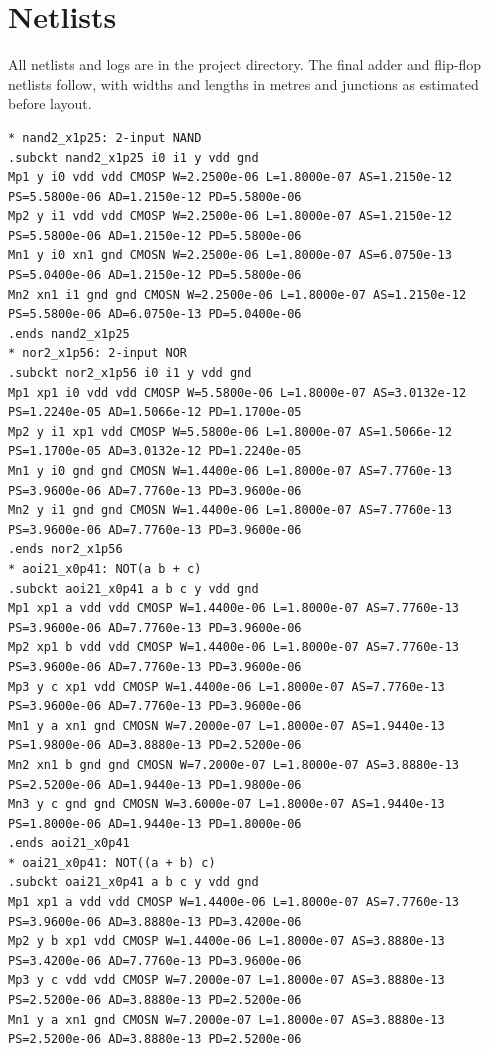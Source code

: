\documentclass[10pt,a4paper]{article}
\begin{document}
\section{Netlists}
All netlists and logs are in the project directory. The final adder and flip-flop netlists follow, with widths and lengths in metres and junctions as estimated before layout.

{\tiny
\begin{verbatim}
* nand2_x1p25: 2-input NAND
.subckt nand2_x1p25 i0 i1 y vdd gnd
Mp1 y i0 vdd vdd CMOSP W=2.2500e-06 L=1.8000e-07 AS=1.2150e-12 PS=5.5800e-06 AD=1.2150e-12 PD=5.5800e-06
Mp2 y i1 vdd vdd CMOSP W=2.2500e-06 L=1.8000e-07 AS=1.2150e-12 PS=5.5800e-06 AD=1.2150e-12 PD=5.5800e-06
Mn1 y i0 xn1 gnd CMOSN W=2.2500e-06 L=1.8000e-07 AS=6.0750e-13 PS=5.0400e-06 AD=1.2150e-12 PD=5.5800e-06
Mn2 xn1 i1 gnd gnd CMOSN W=2.2500e-06 L=1.8000e-07 AS=1.2150e-12 PS=5.5800e-06 AD=6.0750e-13 PD=5.0400e-06
.ends nand2_x1p25
* nor2_x1p56: 2-input NOR
.subckt nor2_x1p56 i0 i1 y vdd gnd
Mp1 xp1 i0 vdd vdd CMOSP W=5.5800e-06 L=1.8000e-07 AS=3.0132e-12 PS=1.2240e-05 AD=1.5066e-12 PD=1.1700e-05
Mp2 y i1 xp1 vdd CMOSP W=5.5800e-06 L=1.8000e-07 AS=1.5066e-12 PS=1.1700e-05 AD=3.0132e-12 PD=1.2240e-05
Mn1 y i0 gnd gnd CMOSN W=1.4400e-06 L=1.8000e-07 AS=7.7760e-13 PS=3.9600e-06 AD=7.7760e-13 PD=3.9600e-06
Mn2 y i1 gnd gnd CMOSN W=1.4400e-06 L=1.8000e-07 AS=7.7760e-13 PS=3.9600e-06 AD=7.7760e-13 PD=3.9600e-06
.ends nor2_x1p56
* aoi21_x0p41: NOT(a b + c)
.subckt aoi21_x0p41 a b c y vdd gnd
Mp1 xp1 a vdd vdd CMOSP W=1.4400e-06 L=1.8000e-07 AS=7.7760e-13 PS=3.9600e-06 AD=7.7760e-13 PD=3.9600e-06
Mp2 xp1 b vdd vdd CMOSP W=1.4400e-06 L=1.8000e-07 AS=7.7760e-13 PS=3.9600e-06 AD=7.7760e-13 PD=3.9600e-06
Mp3 y c xp1 vdd CMOSP W=1.4400e-06 L=1.8000e-07 AS=7.7760e-13 PS=3.9600e-06 AD=7.7760e-13 PD=3.9600e-06
Mn1 y a xn1 gnd CMOSN W=7.2000e-07 L=1.8000e-07 AS=1.9440e-13 PS=1.9800e-06 AD=3.8880e-13 PD=2.5200e-06
Mn2 xn1 b gnd gnd CMOSN W=7.2000e-07 L=1.8000e-07 AS=3.8880e-13 PS=2.5200e-06 AD=1.9440e-13 PD=1.9800e-06
Mn3 y c gnd gnd CMOSN W=3.6000e-07 L=1.8000e-07 AS=1.9440e-13 PS=1.8000e-06 AD=1.9440e-13 PD=1.8000e-06
.ends aoi21_x0p41
* oai21_x0p41: NOT((a + b) c)
.subckt oai21_x0p41 a b c y vdd gnd
Mp1 xp1 a vdd vdd CMOSP W=1.4400e-06 L=1.8000e-07 AS=7.7760e-13 PS=3.9600e-06 AD=3.8880e-13 PD=3.4200e-06
Mp2 y b xp1 vdd CMOSP W=1.4400e-06 L=1.8000e-07 AS=3.8880e-13 PS=3.4200e-06 AD=7.7760e-13 PD=3.9600e-06
Mp3 y c vdd vdd CMOSP W=7.2000e-07 L=1.8000e-07 AS=3.8880e-13 PS=2.5200e-06 AD=3.8880e-13 PD=2.5200e-06
Mn1 y a xn1 gnd CMOSN W=7.2000e-07 L=1.8000e-07 AS=3.8880e-13 PS=2.5200e-06 AD=3.8880e-13 PD=2.5200e-06

\end{verbatim}}
\end{document}
